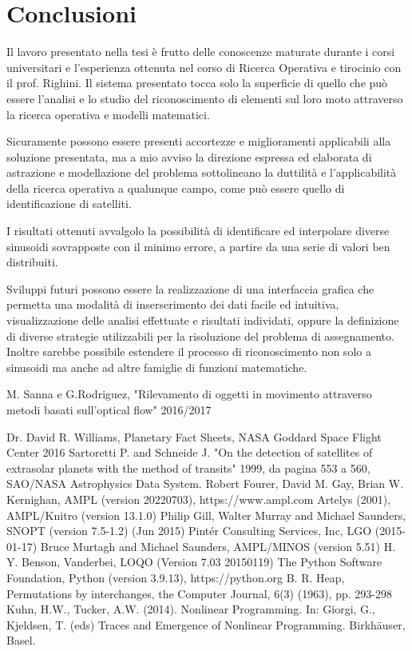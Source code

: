 \documentclass[a4paper,12pt]{report}
\begin{document}
\chapter{Conclusioni}
Il lavoro presentato nella tesi è frutto delle conoscenze maturate durante i corsi universitari e l'esperienza ottenuta nel corso di Ricerca Operativa e tirocinio con il prof. Righini. Il sistema presentato tocca solo la superficie di quello che può essere l'analisi e lo studio del riconoscimento di elementi sul loro moto attraverso la ricerca operativa e modelli matematici.

Sicuramente possono essere presenti accortezze e miglioramenti applicabili alla soluzione presentata, ma a mio avviso la direzione espressa ed elaborata di astrazione e modellazione del problema sottolineano la duttilità e l'applicabilità della ricerca operativa a qualunque campo, come può essere quello di identificazione di satelliti.

I risultati ottenuti avvalgolo la possibilità di identificare ed interpolare diverse sinusoidi sovrapposte con il minimo errore, a partire da una serie di valori ben distribuiti.

Sviluppi futuri possono essere la realizzazione di una interfaccia grafica che permetta una modalità di inserserimento dei dati facile ed intuitiva, visualizzazione delle analisi effettuate e risultati individati, oppure la definizione di diverse strategie utilizzabili per la risoluzione del problema di assegnamento. Inoltre sarebbe possibile estendere il processo di riconoscimento non solo a sinusoidi ma anche ad altre famiglie di funzioni matematiche.




%
%
\begin{thebibliography}{00}

M. Sanna e G.Rodriguez, "Rilevamento di oggetti in movimento attraverso metodi basati sull'optical flow" 2016/2017

Dr. David R. Williams, Planetary Fact Sheets, NASA Goddard Space Flight Center 2016
%
Sartoretti P. and Schneide J. "On the detection of satellites of extrasolar planets with the method of transits" 1999, da pagina 553 a 560, SAO/NASA Astrophysics Data System.
%
Robert Fourer, David M. Gay, Brian W. Kernighan, AMPL (version 20220703), https://www.ampl.com
%
Artelys (2001), AMPL/Knitro (version 13.1.0)
%
Philip Gill, Walter Murray and Michael Saunders, SNOPT (version 7.5-1.2) (Jun 2015)
%
Pintér Consulting Services, Inc, LGO (2015-01-17)
%
Bruce Murtagh and Michael Saunders, AMPL/MINOS (version 5.51)
%
H. Y. Benson, Vanderbei, LOQO (Version 7.03 20150119)
%
The Python Software Foundation, Python (version 3.9.13), https://python.org
%
B. R. Heap, Permutations by interchanges, the Computer Journal, 6(3) (1963), pp. 293-298
%
Kuhn, H.W., Tucker, A.W. (2014). Nonlinear Programming. In: Giorgi, G., Kjeldsen, T. (eds) Traces and Emergence of Nonlinear Programming. Birkhäuser, Basel.



\end{thebibliography}

%
\end{document}
